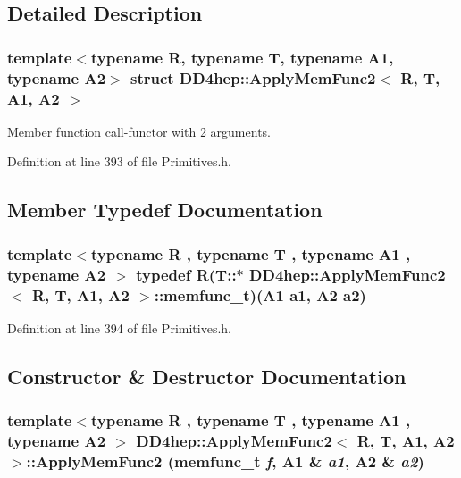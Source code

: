\subsection{Detailed Description}
\subsubsection*{template$<$typename R, typename T, typename A1, typename A2$>$ struct DD4hep::ApplyMemFunc2$<$ R, T, A1, A2 $>$}

Member function call-\/functor with 2 arguments. 

Definition at line 393 of file Primitives.h.

\subsection{Member Typedef Documentation}
\hypertarget{struct_d_d4hep_1_1_apply_mem_func2_add321da903f05b6e55a390aba10c3363}{
\subsubsection[{memfunc\_\-t}]{\setlength{\rightskip}{0pt plus 5cm}template$<$typename R , typename T , typename A1 , typename A2 $>$ typedef R(T::$\ast$ {\bf DD4hep::ApplyMemFunc2}$<$ R, {\bf T}, A1, A2 $>$::{\bf memfunc\_\-t})(A1 a1, A2 a2)}}
\label{struct_d_d4hep_1_1_apply_mem_func2_add321da903f05b6e55a390aba10c3363}


Definition at line 394 of file Primitives.h.

\subsection{Constructor \& Destructor Documentation}
\hypertarget{struct_d_d4hep_1_1_apply_mem_func2_a0ba82d9b15161c878526ffc012f449f6}{
\subsubsection[{ApplyMemFunc2}]{\setlength{\rightskip}{0pt plus 5cm}template$<$typename R , typename T , typename A1 , typename A2 $>$ {\bf DD4hep::ApplyMemFunc2}$<$ R, {\bf T}, A1, A2 $>$::{\bf ApplyMemFunc2} ({\bf memfunc\_\-t} {\em f}, \/  A1 \& {\em a1}, \/  A2 \& {\em a2})}}
\label{struct_d_d4hep_1_1_apply_mem_func2_a0ba82d9b15161c878526ffc012f449f6}


